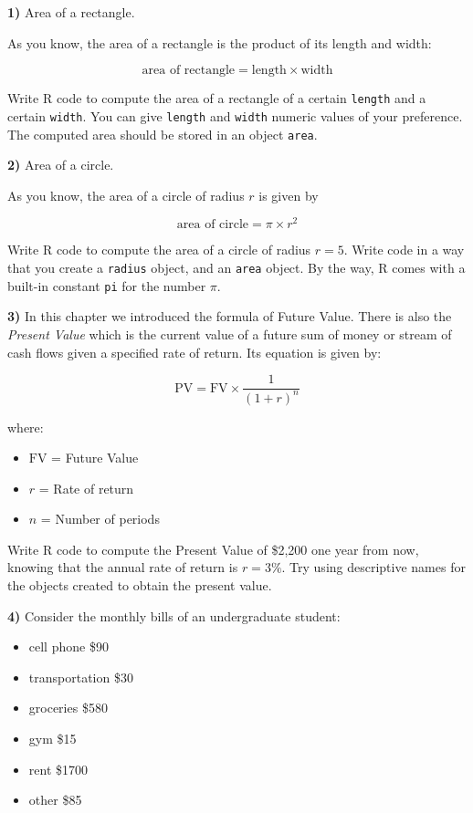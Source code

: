 \documentclass[
]{book}
\providecommand{\tightlist}{%
  \setlength{\itemsep}{0pt}\setlength{\parskip}{0pt}}
\begin{document}
\textbf{1)} Area of a rectangle.

As you know, the area of a rectangle is the product of its length and width:

\[
\text{area of rectangle} = \text{length} \times \text{width}
\]

Write R code to compute the area of a rectangle of a certain \texttt{length} and
a certain \texttt{width}. You can give \texttt{length} and \texttt{width} numeric values of your
preference. The computed area should be stored in an object \texttt{area}.

\textbf{2)} Area of a circle.

As you know, the area of a circle of radius \(r\) is given by

\[
\text{area of circle} = \pi \times r^2
\]

Write R code to compute the area of a circle of radius \(r = 5\). Write code in
a way that you create a \texttt{radius} object, and an \texttt{area} object. By the way,
R comes with a built-in constant \texttt{pi} for the number \(\pi\).

\textbf{3)} In this chapter we introduced the formula of Future Value. There is
also the \emph{Present Value} which is the current value of a future sum of money or
stream of cash flows given a specified rate of return. Its equation is given by:

\[
\text{PV} = \text{FV} \times \frac{1}{(1 + r)^n}
\]

where:

\begin{itemize}
\tightlist
\item
  \(\text{FV}\) = Future Value
\item
  \(r\) = Rate of return
\item
  \(n\) = Number of periods
\end{itemize}

Write R code to compute the Present Value of \$2,200 one year from now,
knowing that the annual rate of return is \(r=3\%\). Try using descriptive
names for the objects created to obtain the present value.

\textbf{4)} Consider the monthly bills of an undergraduate student:

\begin{itemize}
\tightlist
\item
  cell phone \$90
\item
  transportation \$30
\item
  groceries \$580
\item
  gym \$15
\item
  rent \$1700
\item
  other \$85
\end{itemize}
\end{document}
